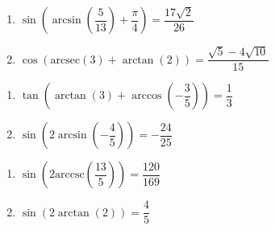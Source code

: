\begin{multicols}{2}

\begin{enumerate}

\setcounter{enumi}{\value{HW}}

\item  $\sin\left(\arcsin\left( \dfrac{5}{13} \right) + \dfrac{\pi}{4}\right) = \dfrac{17\sqrt{2}}{26}$
\item  $\cos\left( \text{arcsec}(3) + \arctan(2) \right) = \dfrac{\sqrt{5} - 4\sqrt{10}}{15}$ %

\setcounter{HW}{\value{enumi}}

\end{enumerate}

\end{multicols}

\begin{multicols}{2}

\begin{enumerate}

\setcounter{enumi}{\value{HW}}

\item  $\tan\left( \arctan(3) + \arccos\left(-\dfrac{3}{5}\right) \right) = \dfrac{1}{3}$
\item  $\sin\left(2\arcsin\left(-\dfrac{4}{5}\right)\right)= -\dfrac{24}{25}$

\setcounter{HW}{\value{enumi}}

\end{enumerate}

\end{multicols}

\begin{multicols}{2}

\begin{enumerate}

\setcounter{enumi}{\value{HW}}

\item  $\sin\left(2\text{arccsc}\left(\dfrac{13}{5}\right)\right) = \dfrac{120}{169}$
\item  $\sin\left(2\arctan\left(2\right)\right) = \dfrac{4}{5}$ 

\setcounter{HW}{\value{enumi}}

\end{enumerate}

\end{multicols}


